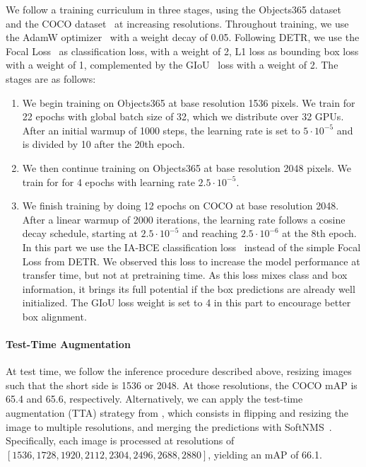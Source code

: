 We follow a training curriculum in three stages, using the Objects365 dataset~\citep{shao2019objects365} and the COCO dataset~\citep{Lin2014cocodataset} at increasing resolutions.
Throughout training, we use the AdamW optimizer~\citep{loshchilov2017decoupled} with a weight decay of 0.05.
Following DETR, we use the Focal Loss~\citep{lin2018focallossdenseobject} as classification loss, with a weight of 2, L1 loss as bounding box loss with a weight of 1, complemented by the GIoU~\citep{rezatofighi2019generalizedintersectionunionmetric} loss with a weight of 2.
The stages are as follows:
\begin{enumerate}
    \item 
    We begin training on Objects365 at base resolution 1536 pixels.
    We train for 22 epochs with global batch size of 32, which we distribute over 32 GPUs.
    After an initial warmup of 1000 steps, the learning rate is set to \(5\cdot10^{-5}\) and is divided by 10 after the 20th epoch.
    \item
    We then continue training on Objects365 at base resolution 2048 pixels.
    We train for for 4 epochs with learning rate \(2.5\cdot10^{-5}\).
    \item 
    We finish training by doing 12 epochs on COCO at base resolution 2048.
    After a linear warmup of 2000 iterations, the learning rate follows a cosine decay schedule, starting at \(2.5\cdot10^{-5}\) and reaching \(2.5\cdot10^{-6}\) at the 8th epoch.
    In this part we use the IA-BCE classification loss~\citep{cai2024aligndetrenhancingendtoendobject} instead of the simple Focal Loss from DETR.
    We observed this loss to increase the model performance at transfer time, but not at pretraining time.
    As this loss mixes class and box information, it brings its full potential if the box predictions are already well initialized.
    The GIoU loss weight is set to 4 in this part to encourage better box alignment.
\end{enumerate}

\paragraph{Test-Time Augmentation}
At test time, we follow the inference procedure described above, resizing images such that the short side is 1536 or 2048.
At those resolutions, the COCO mAP is 65.4 and 65.6, respectively.
Alternatively, we can apply the test-time augmentation (TTA) strategy from \citet{bolya2025perception}, which consists in flipping and resizing the image to multiple resolutions, and merging the predictions with SoftNMS~\citep{Bodla_2017_ICCV}.
Specifically, each image is processed at resolutions of \([1536, 1728, 1920, 2112, 2304, 2496, 2688, 2880]\), yielding an mAP of 66.1.

